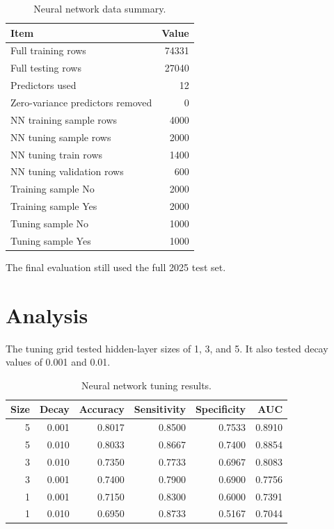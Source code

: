 \documentclass[11pt,oneside,openany]{book}
\begin{document}
\begin{table}[H]
\centering
\small
\caption{Neural network data summary.}
\begin{tabular}{lr}
\toprule
Item & Value\\
\midrule
Full training rows & 74331\\
Full testing rows & 27040\\
Predictors used & 12\\
Zero-variance predictors removed & 0\\
NN training sample rows & 4000\\
NN tuning sample rows & 2000\\
NN tuning train rows & 1400\\
NN tuning validation rows & 600\\
Training sample No & 2000\\
Training sample Yes & 2000\\
Tuning sample No & 1000\\
Tuning sample Yes & 1000\\
\bottomrule
\end{tabular}
\end{table}

The final evaluation still used the full 2025 test set.

\section{Analysis}

The tuning grid tested hidden-layer sizes of 1, 3, and 5. It also tested decay values of 0.001 and 0.01.

\begin{table}[H]
\centering
\small
\caption{Neural network tuning results.}
\begin{tabular}{rrrrrr}
\toprule
Size & Decay & Accuracy & Sensitivity & Specificity & AUC\\
\midrule
5 & 0.001 & 0.8017 & 0.8500 & 0.7533 & 0.8910\\
5 & 0.010 & 0.8033 & 0.8667 & 0.7400 & 0.8854\\
3 & 0.010 & 0.7350 & 0.7733 & 0.6967 & 0.8083\\
3 & 0.001 & 0.7400 & 0.7900 & 0.6900 & 0.7756\\
1 & 0.001 & 0.7150 & 0.8300 & 0.6000 & 0.7391\\
1 & 0.010 & 0.6950 & 0.8733 & 0.5167 & 0.7044\\
\bottomrule
\end{tabular}
\end{table}
\end{document}
